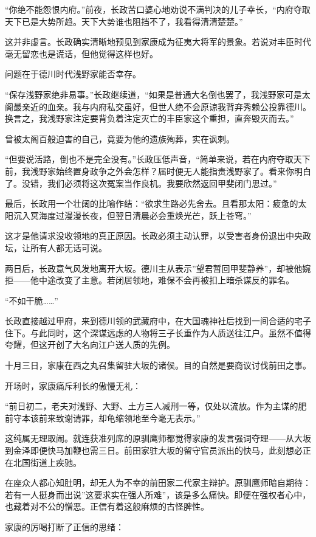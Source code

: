 \documentclass[
]{book}
\begin{document}
``你绝不能怨恨内府。''前夜，长政苦口婆心地劝说不满判决的儿子幸长，``内府夺取天下已是大势所趋。天下大势谁也阻挡不了，我看得清清楚楚。''

这并非虚言。长政确实清晰地预见到家康成为征夷大将军的景象。若说对丰臣时代毫无留恋也是谎话，但他觉得这样也好。

问题在于德川时代浅野家能否幸存。

``保存浅野家绝非易事。''长政继续道，``如果是普通大名倒也罢了，我浅野家可是太阁最亲近的血亲。我与内府私交虽好，但世人绝不会原谅我背弃秀赖公投靠德川。换言之，我浅野家注定要背负着注定灭亡的丰臣家这个重担，直奔毁灭而去。''

曾被太阁百般迫害的自己，竟要为他的遗族殉葬，实在讽刺。

``但要说活路，倒也不是完全没有。''长政压低声音，``简单来说，若在内府夺取天下前，我浅野家始终置身政争之外会怎样？届时便无人能指责浅野家了。看来你明白了。没错，我们必须将这次冤案当作良机。我要欣然返回甲斐闭门思过。''

最后，长政用一个壮阔的比喻作结：``欲求生路必先舍去。且看那太阳：疲惫的太阳沉入冥海度过漫漫长夜，但翌日清晨必会重焕光芒，跃上苍穹。''

这才是他请求没收领地的真正原因。长政必须主动认罪，以受害者身份退出中央政坛，让所有人都无话可说。

两日后，长政意气风发地离开大坂。德川主从表示''望君暂回甲斐静养''，却被他婉拒------他中途改变了主意。若闭居领地，难保不会再被扣上暗杀谋反的罪名。

``不如干脆\ldots\ldots{}''

长政直接越过甲府，来到德川领的武藏府中，在大国魂神社后找到一间合适的宅子住下。与此同时，这个深谋远虑的人物将三子长重作为人质送往江户。虽然不值得夸耀，但这开创了大名向江户送人质的先例。

十月三日，家康在西之丸召集留驻大坂的诸侯。目的自然是要商议讨伐前田之事。

开场时，家康痛斥利长的傲慢无礼：

``前日初二，老夫对浅野、大野、土方三人减刑一等，仅处以流放。作为主谋的肥前守本该前来致谢请罪，却龟缩领地至今毫无表示。''

这纯属无理取闹。就连获准列席的原驯鹰师都觉得家康的发言强词夺理------从大坂到金泽即便快马加鞭也需三日。前田家驻大坂的留守官员派出的快马，此刻想必正在北国街道上疾驰。

在座众人都心知肚明，却无人为不幸的前田家二代家主辩护。原驯鹰师暗自期待：若有一人挺身而出说''这要求实在强人所难''，该是多么痛快。即便在强权者心中，也藏着对不公的憎恶。正信有着这般麻烦的古怪脾性。

家康的厉喝打断了正信的思绪：
\end{document}
